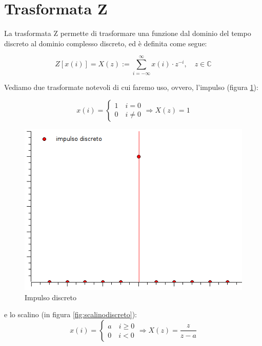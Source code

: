 \section{Trasformata Z}
La trasformata Z\citet{book:trasformataz} permette di trasformare una funzione dal dominio del tempo discreto al dominio complesso discreto, ed è definita come segue:

\[ Z[x(i)]=X(z):=\sum_{i=-\infty}^{\infty}{x(i)\cdot z^{-i}},\quad z \in \mathbb{C}  \]

\noindent Vediamo due trasformate notevoli di cui faremo uso, ovvero, l'impulso (figura \ref{fig:impulsodiscreto}):

\[
x(i)=
\left\{
\begin{aligned}
1 \quad i=0 \\
0 \quad i\neq 0
\end{aligned}
\right.\Longrightarrow X(z)=1
\]

\begin{figure}[htbp]
  \centering
  \includegraphics[scale=0.5]{img/impulsodiscreto.png}
  \caption{Impulso discreto\label{fig:impulsodiscreto}}
\end{figure}

\noindent e lo scalino (in figura \ref{fig:scalinodiscreto}):
\[
x(i)=
\left\{
\begin{aligned}
a \quad i\geq 0 \\
0 \quad i < 0
\end{aligned}
\right.\Longrightarrow X(z)=\frac{z}{z-a}
\]

